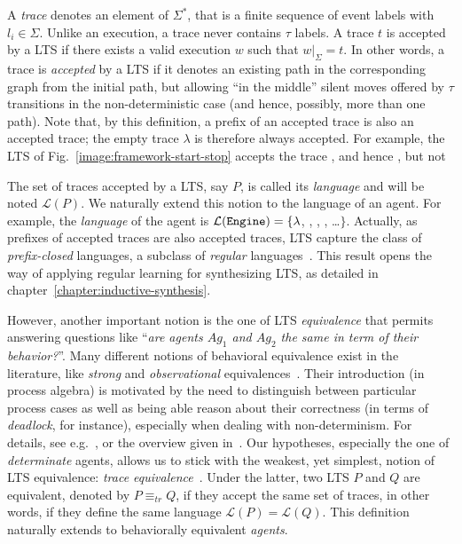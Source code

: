 A \emph{trace} denotes an element of $\Sigma^*$, that is a finite sequence of event labels  with $l_i \in \Sigma$. Unlike an execution, a trace never contains $\tau$ labels. A trace $t$ is accepted by a LTS if there exists a valid execution $w$ such that $w|_{\Sigma} = t$. In other words, a trace is \emph{accepted} by a LTS if it denotes an existing path in the corresponding graph from the initial path, but allowing ``in the middle'' silent moves offered by $\tau$ transitions in the non-deterministic case (and hence, possibly, more than one path). Note that, by this definition, a prefix of an accepted trace is also an accepted trace; the empty trace $\lambda$ is therefore always accepted. For example, the LTS of Fig.~\ref{image:framework-start-stop} accepts the trace , and hence , but not 

The set of traces accepted by a LTS, say $P$, is called its \emph{language} and will be noted $\mathcal{L}(P)$. We naturally extend this notion to the language of an agent. For example, the  \emph{language} of the  agent is $\mathcal{L}(\texttt{Engine})=\{\lambda$, , , , \ldots $\}$. Actually, as prefixes of accepted traces are also accepted traces, LTS capture the class of \emph{prefix-closed} languages, a subclass of \emph{regular} languages~\cite{Hopcroft:1979}. This result opens the way of applying regular learning for synthesizing LTS, as detailed in chapter~\ref{chapter:inductive-synthesis}.

However, another important notion is the one of LTS \emph{equivalence} that permits answering questions like ``\emph{are agents $Ag_1$ and $Ag_2$ the same in term of their behavior?}''. Many different notions of behavioral equivalence exist in the literature, like \emph{strong} and \emph{observational}  equivalences~\cite{Milner:1989}. Their introduction (in process algebra) is motivated by the need to distinguish between particular process cases as well as being able reason about their correctness (in terms of \emph{deadlock}, for instance), especially when dealing with non-determinism. For details, see e.g.~\cite[chap. 3]{Hoare:1985}, \cite[chap. 4 \& 5]{Milner:1989} or the overview given in~\cite{Fernandez:1991}. Our hypotheses, especially the one of \emph{determinate} agents, allows us to stick with the weakest, yet simplest, notion of LTS equivalence: \emph{trace equivalence}~\cite{Hoare:1985, Engelfriet:1985}. Under the latter, two LTS $P$ and $Q$ are equivalent, denoted by $P \equiv_{tr} Q$, if they accept the same set of traces, in other words, if they define the same language $\mathcal{L}(P) = \mathcal{L}(Q)$. This definition naturally extends to behaviorally equivalent \emph{agents}.

